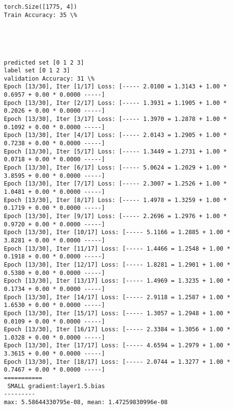 \documentclass[11pt]{article}
\begin{document}
    \begin{Verbatim}[commandchars=\\\{\}]
torch.Size([1775, 4])
Train Accuracy: 35 \%

    \end{Verbatim}

    \begin{center}
    \end{center}
    { \hspace*{\fill} \\}
    
    \begin{center}
    \end{center}
    { \hspace*{\fill} \\}
    
    \begin{Verbatim}[commandchars=\\\{\}]
predicted set [0 1 2 3]
label set [0 1 2 3]
validation Accuracy: 31 \%
Epoch [13/30], Iter [1/17] Loss: [----- 2.0100 = 1.3143 + 1.00 * 0.6957 + 0.00 * 0.0000 -----]
Epoch [13/30], Iter [2/17] Loss: [----- 1.3931 = 1.1905 + 1.00 * 0.2026 + 0.00 * 0.0000 -----]
Epoch [13/30], Iter [3/17] Loss: [----- 1.3970 = 1.2878 + 1.00 * 0.1092 + 0.00 * 0.0000 -----]
Epoch [13/30], Iter [4/17] Loss: [----- 2.0143 = 1.2905 + 1.00 * 0.7238 + 0.00 * 0.0000 -----]
Epoch [13/30], Iter [5/17] Loss: [----- 1.3449 = 1.2731 + 1.00 * 0.0718 + 0.00 * 0.0000 -----]
Epoch [13/30], Iter [6/17] Loss: [----- 5.0624 = 1.2029 + 1.00 * 3.8595 + 0.00 * 0.0000 -----]
Epoch [13/30], Iter [7/17] Loss: [----- 2.3007 = 1.2526 + 1.00 * 1.0481 + 0.00 * 0.0000 -----]
Epoch [13/30], Iter [8/17] Loss: [----- 1.4978 = 1.3259 + 1.00 * 0.1719 + 0.00 * 0.0000 -----]
Epoch [13/30], Iter [9/17] Loss: [----- 2.2696 = 1.2976 + 1.00 * 0.9720 + 0.00 * 0.0000 -----]
Epoch [13/30], Iter [10/17] Loss: [----- 5.1166 = 1.2885 + 1.00 * 3.8281 + 0.00 * 0.0000 -----]
Epoch [13/30], Iter [11/17] Loss: [----- 1.4466 = 1.2548 + 1.00 * 0.1918 + 0.00 * 0.0000 -----]
Epoch [13/30], Iter [12/17] Loss: [----- 1.8281 = 1.2901 + 1.00 * 0.5380 + 0.00 * 0.0000 -----]
Epoch [13/30], Iter [13/17] Loss: [----- 1.4969 = 1.3235 + 1.00 * 0.1734 + 0.00 * 0.0000 -----]
Epoch [13/30], Iter [14/17] Loss: [----- 2.9118 = 1.2587 + 1.00 * 1.6530 + 0.00 * 0.0000 -----]
Epoch [13/30], Iter [15/17] Loss: [----- 1.3057 = 1.2948 + 1.00 * 0.0109 + 0.00 * 0.0000 -----]
Epoch [13/30], Iter [16/17] Loss: [----- 2.3384 = 1.3056 + 1.00 * 1.0328 + 0.00 * 0.0000 -----]
Epoch [13/30], Iter [17/17] Loss: [----- 4.6594 = 1.2979 + 1.00 * 3.3615 + 0.00 * 0.0000 -----]
Epoch [13/30], Iter [18/17] Loss: [----- 2.0744 = 1.3277 + 1.00 * 0.7467 + 0.00 * 0.0000 -----]
===========
 SMALL gradient:layer1.5.bias
---------
max: 5.58644330795e-08, mean: 1.47259830996e-08

    \end{Verbatim}
\end{document}
